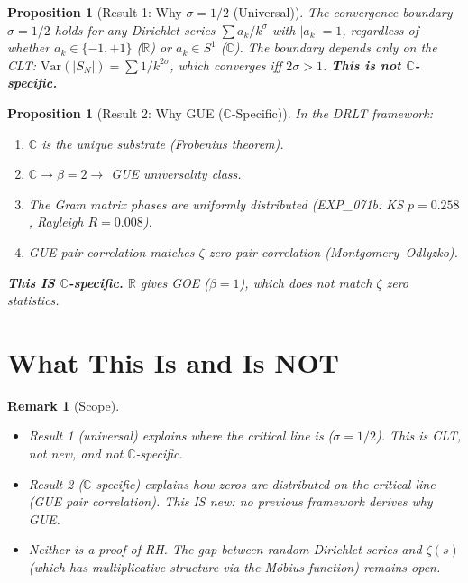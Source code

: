 \documentclass[11pt]{article}
\newtheorem{proposition}[theorem]{Proposition}
\newtheorem{remark}[theorem]{Remark}
\begin{document}
\begin{proposition}[Result 1: Why $\sigma = 1/2$ (Universal)]
The convergence boundary $\sigma = 1/2$ holds for \emph{any}
Dirichlet series $\sum a_k / k^\sigma$ with $|a_k| = 1$,
regardless of whether $a_k \in \{-1, +1\}$ ($\mathbb{R}$)
or $a_k \in S^1$ ($\mathbb{C}$).
The boundary depends only on the CLT:
$\mathrm{Var}(|S_N|) = \sum 1/k^{2\sigma}$, which converges
iff $2\sigma > 1$.
\textbf{This is not $\mathbb{C}$-specific.}
\end{proposition}

\begin{proposition}[Result 2: Why GUE ($\mathbb{C}$-Specific)]
In the DRLT framework:
\begin{enumerate}
  \item $\mathbb{C}$ is the unique substrate (Frobenius theorem).
  \item $\mathbb{C} \to \beta = 2 \to$ GUE universality class.
  \item The Gram matrix phases are uniformly distributed
    (EXP\_071b: KS $p = 0.258$, Rayleigh $R = 0.008$).
  \item GUE pair correlation matches $\zeta$ zero pair correlation
    (Montgomery--Odlyzko).
\end{enumerate}
\textbf{This IS $\mathbb{C}$-specific.} $\mathbb{R}$ gives GOE ($\beta = 1$),
which does not match $\zeta$ zero statistics.
\end{proposition}

\section{What This Is and Is NOT}

\begin{remark}[Scope]
\begin{itemize}
  \item Result 1 (universal) explains \emph{where} the critical line is
    ($\sigma = 1/2$).  This is CLT, not new, and not $\mathbb{C}$-specific.
  \item Result 2 ($\mathbb{C}$-specific) explains \emph{how} zeros are
    distributed on the critical line (GUE pair correlation).
    This IS new: no previous framework derives \emph{why} GUE.
  \item Neither is a proof of RH.  The gap between random Dirichlet
    series and $\zeta(s)$ (which has multiplicative structure via
    the M\"obius function) remains open.
\end{itemize}
\end{remark}
\end{document}
